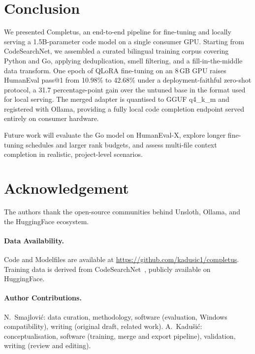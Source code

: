 \section{Conclusion}

We presented Completus, an end-to-end pipeline for fine-tuning and
locally serving a 1.5B-parameter code model on a single consumer GPU.
Starting from CodeSearchNet, we assembled a curated bilingual training
corpus covering Python and Go, applying deduplication, smell
filtering, and a fill-in-the-middle data transform. One epoch of
QLoRA fine-tuning on an 8\,GB GPU raises HumanEval pass@1 from 10.98\%
to 42.68\% under a deployment-faithful zero-shot protocol, a 31.7
percentage-point gain over the untuned base in the format used for
local serving. The merged adapter is quantised to GGUF q4\_k\_m and
registered with Ollama, providing a fully local code completion
endpoint served entirely on consumer hardware.

Future work will evaluate the Go model on HumanEval-X, explore longer
fine-tuning schedules and larger rank budgets, and assess multi-file
context completion in realistic, project-level scenarios.

\section*{Acknowledgement}

The authors thank the open-source communities behind Unsloth, Ollama,
and the HuggingFace ecosystem.

\paragraph{Data Availability.}
Code and Modelfiles are available at
\url{https://github.com/kadusic1/completus}. Training data is derived
from CodeSearchNet~\cite{Husain2019CSN}, publicly available on
HuggingFace.

\paragraph{Author Contributions.}
N.~Smajlovi\'{c}: data curation, methodology, software (evaluation,
Windows compatibility), writing (original draft, related work).
A.~Kadu\v{s}i\'{c}: conceptualisation, software (training, merge and
export pipeline), validation, writing (review and editing).

